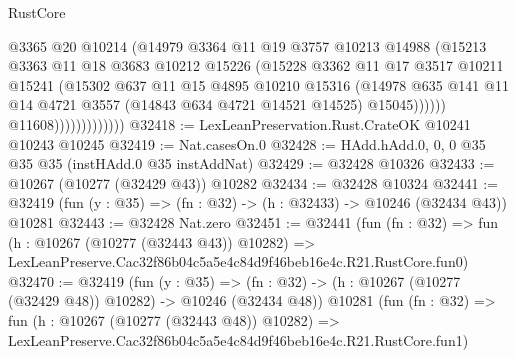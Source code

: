 \begin{lexlean}{RustCore}
\begin{coremodule}
                                @3365
                                @20
                                @10214
                                (@14979
                                  @3364
                                  @11
                                  @19
                                  @3757
                                  @10213
                                  @14988
                                  (@15213
                                    @3363
                                    @11
                                    @18
                                    @3683
                                    @10212
                                    @15226
                                    (@15228
                                      @3362
                                      @11
                                      @17
                                      @3517
                                      @10211
                                      @15241
                                      (@15302
                                        @637
                                        @11
                                        @15
                                        @4895
                                        @10210
                                        @15316
                                        (@14978
                                          @635
                                          @141
                                          @11
                                          @14
                                          @4721
                                          @3557
                                          (@14843 @634 @4721 @14521 @14525)
                                          @15045))))))
                              @11608)))))))))))))
@32418 := LexLeanPreservation.Rust.CrateOK @10241 @10243 @10245
@32419 := Nat.casesOn.{0}
@32428 := HAdd.hAdd.{0, 0, 0} @35 @35 @35 (instHAdd.{0} @35 instAddNat)
@32429 := @32428 @10326
@32433 := @10267 (@10277 (@32429 @43)) @10282
@32434 := @32428 @10324
@32441 := @32419 (fun (y : @35) => (fn : @32) -> (h : @32433) -> @10246 (@32434 @43)) @10281
@32443 := @32428 Nat.zero
@32451 := @32441
    (fun (fn : @32) =>
    fun (h : @10267 (@10277 (@32443 @43)) @10282) =>
    LexLeanPreserve.Cac32f86b04c5a5e4c84d9f46beb16e4c.R21.RustCore.fun0)
@32470 := @32419
    (fun (y : @35) =>
    (fn : @32) -> (h : @10267 (@10277 (@32429 @48)) @10282) -> @10246 (@32434 @48))
    @10281
    (fun (fn : @32) =>
    fun (h : @10267 (@10277 (@32443 @48)) @10282) =>
    LexLeanPreserve.Cac32f86b04c5a5e4c84d9f46beb16e4c.R21.RustCore.fun1)

\end{coremodule}
\end{lexlean}
